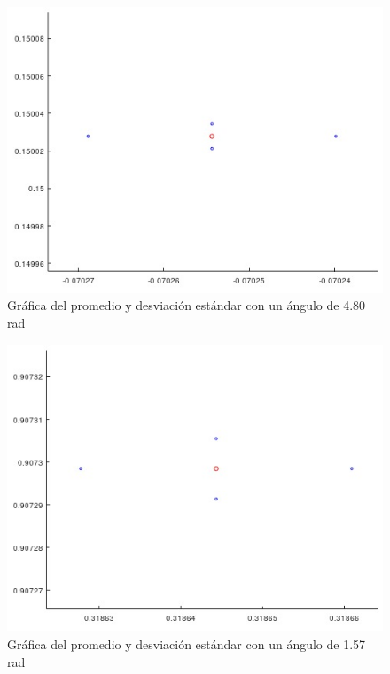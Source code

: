 \documentclass[a4paper, 12pt]{article}
\begin{document}
    \begin{figure}[ht!]
        \centering
        \includegraphics[width=12cm]{img/g9.jpeg}
        \caption{Gráfica del promedio y desviación estándar con un ángulo de 4.80 rad}
        \label{G9}
    \end{figure}

    \begin{figure}[ht!]
        \centering
        \includegraphics[width=12cm]{img/g10.jpeg}
        \caption{Gráfica del promedio y desviación estándar con un ángulo de 1.57 rad}
        \label{G10}
    \end{figure}
\end{document}
